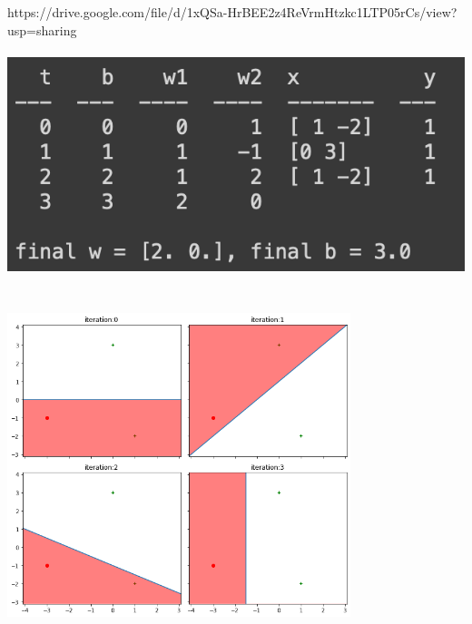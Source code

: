 \begin{solution}
https://drive.google.com/file/d/1xQSa-HrBEE2z4ReVrmHtzkc1LTP05rCs/view?usp=sharing\\
\\
\includegraphics{set1/images/Unknown-14.png}
\\
\\
\includegraphics[width=10cm, height=10cm]{set1/images/Unknown-13.png}

\end{solution}

